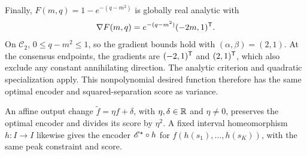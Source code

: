 Finally, $F(m,q)=1-e^{-(q-m^2)}$ is globally real analytic with
$$
 \nabla F(m,q)=e^{-(q-m^2)}(-2m,1)^\mathsf T.
$$
On $\mathcal C_2$, $0\le q-m^2\le1$, so the gradient bounds hold with $(\alpha,\beta)=(2,1)$. At the consensus endpoints, the gradients are $(-2,1)^\mathsf T$ and $(2,1)^\mathsf T$, which also exclude any constant annihilating direction. The analytic criterion and quadratic specialization apply. This nonpolynomial desired function therefore has the same optimal encoder and squared-separation score as variance.

An affine output change $\widetilde f=\eta f+\delta$, with $\eta,\delta\in\mathbb R$ and $\eta\ne0$, preserves the optimal encoder and divides its score by $\eta^2$. A fixed interval homeomorphism $h:I\to I$ likewise gives the encoder $\mathscr E^\star\circ h$ for $f(h(s_1),\ldots,h(s_K))$, with the same peak constraint and score.
